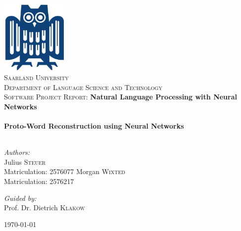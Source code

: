 \begin{titlepage}
\begin{center}

\includegraphics[width=0.25\textwidth]{./eule}~\\[1cm]

\textsc{\LARGE Saarland  University}\\[0.4cm]
\textsc{\Large Department of Language Science and Technology}\\[1.5cm]

\textsc{\Large Software Project Report:} \textbf{\Large Natural Language Processing with Neural Networks}\\[0.5cm]

\HRule \\[1.0cm]

{ \huge \bfseries Proto-Word Reconstruction using Neural Networks}\\[0.4cm]

\HRule \\[1.5cm]

\begin{minipage}{0.4\textwidth}
\begin{flushleft} \large
\emph{Authors:}\\
Julius \textsc{Steuer}\\
Matriculation: 2576077
Morgan \textsc{Wixted}\\
Matriculation: 2576217
\end{flushleft}
\end{minipage}
\begin{minipage}{0.4\textwidth}
\begin{flushright} \large
\emph{Guided by:} \\
Prof. Dr. Dietrich \textsc{Klakow}\\
\end{flushright}
\end{minipage}

\vfill

{\large \today}

\end{center}
\end{titlepage}
